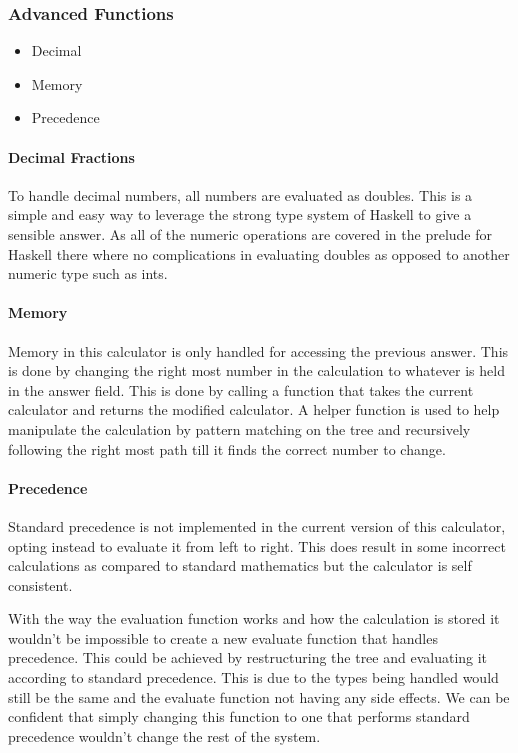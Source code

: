 \documentclass[a4paper]{article}
\begin{document}
\subsubsection{Advanced Functions}
\begin{itemize}
    \item Decimal
    \item Memory
    \item Precedence
\end{itemize}
\paragraph{Decimal Fractions}
To handle decimal numbers, all numbers are evaluated as doubles.
This is a simple and easy way to leverage the strong type system of Haskell to give a sensible answer.
As all of the numeric operations are covered in the prelude for Haskell there where no complications in evaluating doubles as opposed to another numeric type such as ints.

\paragraph{Memory}
Memory in this calculator is only handled for accessing the previous answer.
This is done by changing the right most number in the calculation to whatever is held in the answer field.
This is done by calling a function that takes the current calculator and returns the modified calculator.
A helper function is used to help manipulate the calculation by pattern matching on the tree and recursively following the right most path till it finds the correct number to change.


\paragraph{Precedence}
Standard precedence is not implemented in the current version of this calculator, opting instead to evaluate it from left to right.
This does result in some incorrect calculations as compared to standard mathematics but the calculator is self consistent.
\par
With the way the evaluation function works and how the calculation is stored it wouldn't be impossible to create a new evaluate function that handles precedence.
This could be achieved by restructuring the tree and evaluating it according to standard precedence.
This is due to the types being handled would still be the same and the evaluate function not having any side effects.
We can be confident that simply changing this function to one that performs standard precedence wouldn't change the rest of the system.
\end{document}
